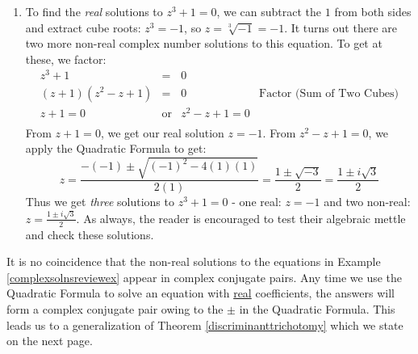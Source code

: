 {\begin{enumerate}
\[\begin{array}{rclr}
2t^4 & = & 9t^2 + 5 & \\

2t^4 - 9t^2 - 5 & = & 0 & \text{Subtract $9t^2$ and $5$} \\
(2t^2 + 1)(t^2 - 5) & = & 0 & \text{Factor} \\
2t^2 + 1 = 0 & \text{or} & t^2 = 5 & \text{Zero Product Property} \\
\end{array}\]  From $2t^2 + 1 = 0$ we get $2t^2 = -1$, or $t^2 = -\frac{1}{2}$.  We extract square roots as follows: \[ t = \pm \sqrt{-\dfrac{1}{2}} = \pm i \sqrt{\dfrac{1}{2}} = \pm i \dfrac{\sqrt{1}}{\sqrt{2}} = \pm i \dfrac{1}{\sqrt{2}} = \pm \dfrac{i \sqrt{2}}{2},\]
where we have rationalized the denominator per convention.  From $t^2 = 5$, we get $t = \pm \sqrt{5}$. In total, we have four complex solutions - two real: $t = \pm \sqrt{5}$ and two non-real: $t = \pm \frac{i \sqrt{2}}{2}$.

\item To find  the \textit{real} solutions to  $z^3 + 1 = 0$, we can subtract the $1$ from both sides and extract cube roots: $z^3 = -1$, so $z  = \sqrt[3]{-1} = -1$.  It turns out there are two more non-real complex number solutions to this equation.  To get at these, we factor:\[ \begin{array}{rclr}

z ^ 3 + 1 & = & 0 & \\
(z + 1)(z^2 - z + 1) & = & 0 & \text{Factor (Sum of Two Cubes)} \\
z + 1 = 0 & \text{or} & z^2 - z + 1 = 0 & \\
\end{array} \] From $z+1 = 0$, we get our real solution $z = -1$.  From $z^2 -z + 1 = 0$, we apply the Quadratic Formula to get: \[z = \dfrac{-(-1) \pm \sqrt{(-1)^2 - 4(1)(1)}}{2(1)} = \dfrac{1 \pm \sqrt{-3}}{2} = \dfrac{1 \pm i\sqrt{3}}{2} \]
Thus we get \textit{three} solutions to $z^3 + 1 = 0$ - one real: $z = -1$ and two non-real: $z =  \frac{1 \pm i\sqrt{3}}{2}$.  As always, the reader is encouraged to test their algebraic mettle and check these solutions. 
		
\end{enumerate}
}

\medskip

It is no coincidence that the non-real solutions to the equations in Example \ref{complexsolnsreviewex} appear in  complex conjugate pairs. Any time we use the Quadratic Formula to solve an equation with \underline{real} coefficients, the answers will form a  complex conjugate pair owing to the $\pm$ in the Quadratic Formula.  This leads us to a generalization of Theorem \ref{discriminanttrichotomy} which we state on the next page.

